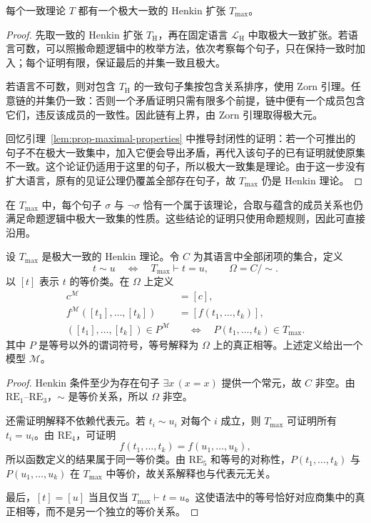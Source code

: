 \documentclass[lang=cn,a4paper,fontset=none,zihao=false,10pt,openany,twoside]{beautybook}
\numberwithin{algorithm}{chapter}
\begin{document}
\begin{lemma}\label{lem:henkin-max}
每个一致理论 $T$ 都有一个极大一致的 Henkin 扩张 $T_{\max}$。
\end{lemma}
\begin{proof}
先取一致的 Henkin 扩张 $T_{\mathrm H}$，再在固定语言 $\mathcal L_{\mathrm H}$ 中取极大一致扩张。若语言可数，可以照搬命题逻辑中的枚举方法，依次考察每个句子，只在保持一致时加入；每个证明有限，保证最后的并集一致且极大。

若语言不可数，则对包含 $T_{\mathrm H}$ 的一致句子集按包含关系排序，使用 Zorn 引理。任意链的并集仍一致：否则一个矛盾证明只需有限多个前提，链中便有一个成员包含它们，违反该成员的一致性。因此链有上界，由 Zorn 引理取得极大元。

回忆引理~\ref{lem:prop-maximal-properties} 中推导封闭性的证明：若一个可推出的句子不在极大一致集中，加入它便会导出矛盾，再代入该句子的已有证明就使原集不一致。这个论证仍适用于这里的句子，所以极大一致集是理论。由于这一步没有扩大语言，原有的见证公理仍覆盖全部存在句子，故 $T_{\max}$ 仍是 Henkin 理论。
\end{proof}
在 $T_{\max}$ 中，每个句子 $\sigma$ 与 $\neg\sigma$ 恰有一个属于该理论，合取与蕴含的成员关系也仍满足命题逻辑中极大一致集的性质。这些结论的证明只使用命题规则，因此可直接沿用。

\Needspace{78mm}
\begin{lemma}[闭项模型]\label{lem:term-model}
设 $T_{\max}$ 是极大一致的 Henkin 理论。令 $C$ 为其语言中全部闭项的集合，定义
\[
 t\sim u\quad\Longleftrightarrow\quad T_{\max}\vdash t=u,
 \qquad \Omega=C/{\sim}.
\]
以 $[t]$ 表示 $t$ 的等价类。在 $\Omega$ 上定义
\begin{align*}
 c^{\mathcal M}&=[c],\\
 f^{\mathcal M}([t_1],\ldots,[t_k])&=[f(t_1,\ldots,t_k)],\\
 ([t_1],\ldots,[t_k])\in P^{\mathcal M}
 &\quad\Longleftrightarrow\quad P(t_1,\ldots,t_k)\in T_{\max}.
\end{align*}
其中 $P$ 是等号以外的谓词符号，等号解释为 $\Omega$ 上的真正相等。上述定义给出一个模型 $\mathcal M$。
\end{lemma}
\begin{proof}
Henkin 条件至少为存在句子 $\exists x\,(x=x)$ 提供一个常元，故 $C$ 非空。由 $\mathrm{RE}_1$--$\mathrm{RE}_3$，$\sim$ 是等价关系，所以 $\Omega$ 非空。

还需证明解释不依赖代表元。若 $t_i\sim u_i$ 对每个 $i$ 成立，则 $T_{\max}$ 可证明所有 $t_i=u_i$。由 $\mathrm{RE}_4$，可证明
\[
 f(t_1,\ldots,t_k)=f(u_1,\ldots,u_k),
\]
所以函数定义的结果属于同一等价类。由 $\mathrm{RE}_5$ 和等号的对称性，$P(t_1,\ldots,t_k)$ 与 $P(u_1,\ldots,u_k)$ 在 $T_{\max}$ 中等价，故关系解释也与代表元无关。

最后，$[t]=[u]$ 当且仅当 $T_{\max}\vdash t=u$。这使语法中的等号恰好对应商集中的真正相等，而不是另一个独立的等价关系。
\end{proof}
\end{document}
